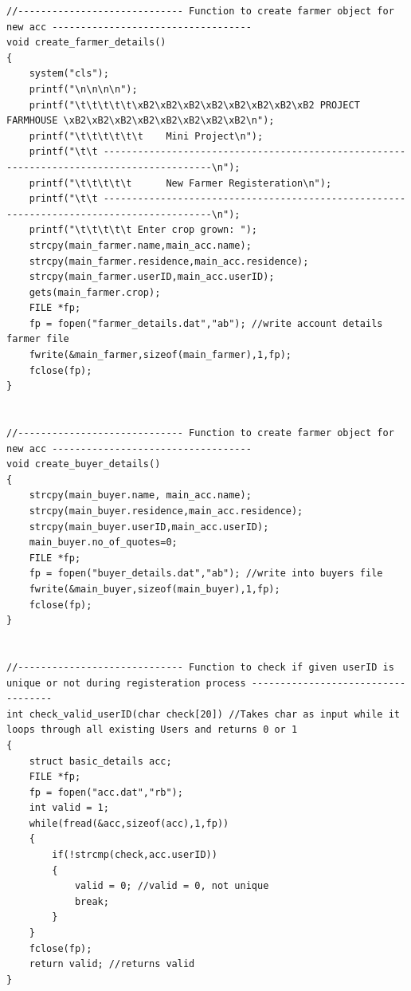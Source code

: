 \documentclass[12pt]{article}
\begin{document}
\begin{lstlisting}
//----------------------------- Function to create farmer object for new acc -----------------------------------
void create_farmer_details()
{
    system("cls");
    printf("\n\n\n\n");
    printf("\t\t\t\t\t\xB2\xB2\xB2\xB2\xB2\xB2\xB2\xB2 PROJECT FARMHOUSE \xB2\xB2\xB2\xB2\xB2\xB2\xB2\xB2\n");
    printf("\t\t\t\t\t\t    Mini Project\n");
    printf("\t\t -----------------------------------------------------------------------------------------\n");
    printf("\t\t\t\t\t      New Farmer Registeration\n");
    printf("\t\t -----------------------------------------------------------------------------------------\n");
    printf("\t\t\t\t\t Enter crop grown: ");
    strcpy(main_farmer.name,main_acc.name);
    strcpy(main_farmer.residence,main_acc.residence);
    strcpy(main_farmer.userID,main_acc.userID);
    gets(main_farmer.crop);
    FILE *fp;
    fp = fopen("farmer_details.dat","ab"); //write account details farmer file
    fwrite(&main_farmer,sizeof(main_farmer),1,fp);
    fclose(fp);
}


//----------------------------- Function to create farmer object for new acc -----------------------------------
void create_buyer_details()
{
    strcpy(main_buyer.name, main_acc.name);
    strcpy(main_buyer.residence,main_acc.residence);
    strcpy(main_buyer.userID,main_acc.userID);
    main_buyer.no_of_quotes=0;
    FILE *fp;
    fp = fopen("buyer_details.dat","ab"); //write into buyers file
    fwrite(&main_buyer,sizeof(main_buyer),1,fp);
    fclose(fp);
}


//----------------------------- Function to check if given userID is unique or not during registeration process -----------------------------------
int check_valid_userID(char check[20]) //Takes char as input while it loops through all existing Users and returns 0 or 1
{
    struct basic_details acc;
    FILE *fp;
    fp = fopen("acc.dat","rb");
    int valid = 1;
    while(fread(&acc,sizeof(acc),1,fp))
    {
        if(!strcmp(check,acc.userID))
        {
            valid = 0; //valid = 0, not unique
            break;
        }
    }
    fclose(fp);
    return valid; //returns valid
}



\end{lstlisting}
\end{document}
